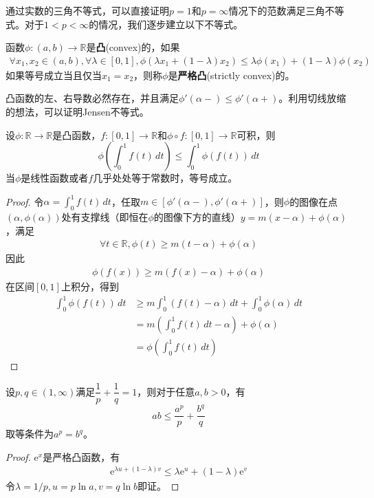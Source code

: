 \documentclass{ctexbook}
\begin{document}
通过实数的三角不等式，可以直接证明$p=1$和$p=\infty$情况下的范数满足三角不等式。对于$1<p<\infty$的情况，我们逐步建立以下不等式。

\begin{definition}[凸函数]
    函数$\phi:(a,b)\to\mathbb{R}$是\textbf{凸}(convex)的，如果\begin{align*}
        \forall x_1,x_2\in(a,b),\forall \lambda\in[0,1],\phi(\lambda x_1+(1-\lambda)x_2)\leq \lambda\phi(x_1)+(1-\lambda)\phi(x_2)
    \end{align*}
    如果等号成立当且仅当$x_1=x_2$，则称$\phi$是\textbf{严格凸}(strictly convex)的。
\end{definition}

凸函数的左、右导数必然存在，并且满足$\phi'(\alpha-)\leq \phi'(\alpha+)$。利用切线放缩的想法，可以证明Jensen不等式。

\begin{theorem}[Jensen不等式]
    设$\phi:\mathbb{R}\to\mathbb{R}$是凸函数，$f:[0,1]\to\mathbb{R}$和$\phi\circ f:[0,1]\to\mathbb{R}$可积，则
    \[\phi\left(\int_0^1 f(t)\,dt\right)\leq \int_0^1 \phi(f(t))\,dt\]
    当$\phi$是线性函数或者$f$几乎处处等于常数时，等号成立。
\end{theorem}
\begin{proof}
    令$\alpha=\int_0^1 f(t)\,dt$，任取$m\in[\phi'(\alpha-),\phi'(\alpha+)]$，则$\phi$的图像在点$(\alpha,\phi(\alpha))$处有支撑线（即恒在$\phi$的图像下方的直线）$y=m(x-\alpha)+\phi(\alpha)$，满足\begin{align*}
        \forall t\in\mathbb{R},\phi(t)\geq m(t-\alpha)+\phi(\alpha)
    \end{align*}
    因此\begin{align*}
        \phi(f(x))\geq m(f(x)-\alpha)+\phi(\alpha)
    \end{align*}
    在区间$[0,1]$上积分，得到\begin{align*}
        \int_0^1 \phi(f(t))\,dt & \geq m\int_0^1 (f(t)-\alpha)\,dt+\int_0^1 \phi(\alpha)\,dt \\
                   & =m\left(\int_0^1 f(t)\,dt-\alpha\right)+\phi(\alpha) \\
                   & =\phi\left(\int_0^1 f(t)\,dt\right)
    \end{align*}
\end{proof}

\begin{theorem}[Young不等式]
    设$p,q\in(1,\infty)$满足$\dfrac{1}{p}+\dfrac{1}{q}=1$，则对于任意$a,b>0$，有
    \[ab\leq \frac{a^p}{p}+\frac{b^q}{q}\]
    取等条件为$a^p=b^q$。
\end{theorem}
\begin{proof}
    $\mathrm{e}^x$是严格凸函数，有\begin{align*}
        \mathrm{e}^{\lambda u+(1-\lambda)v}  \leq \lambda \mathrm{e}^u+(1-\lambda)\mathrm{e}^v
    \end{align*}
    令$\lambda=1/p,u=p\ln a,v=q\ln b$即证。
\end{proof}
\end{document}
